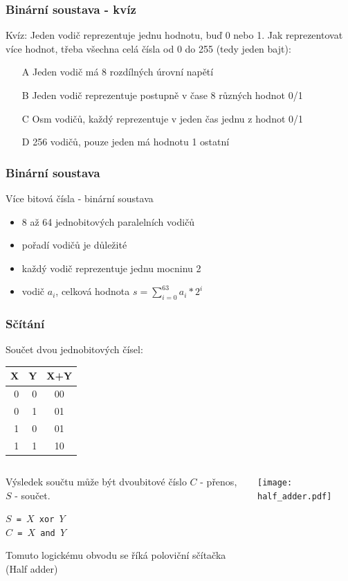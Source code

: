 \documentclass{beamer}
\begin{document}
\begin{frame}
\frametitle{Binární soustava - kvíz}

Kvíz: Jeden vodič reprezentuje jednu hodnotu, buď 0 nebo 1. Jak reprezentovat více hodnot, třeba všechna celá čísla od 0 do 255 (tedy jeden bajt):
\begin{itemize}
\item[A] Jeden vodič má 8 rozdílných úrovní napětí
\item[B] Jeden vodič reprezentuje postupně v čase 8 různých hodnot 0/1
\item[C] Osm vodičů, každý reprezentuje v jeden čas jednu z hodnot 0/1
\item[D] 256 vodičů, pouze jeden má hodnotu 1 ostatní 
\end{itemize}


\end{frame}


\begin{frame}
\frametitle{Binární soustava}

Více bitová čísla - binární soustava
\begin{itemize}
\item 8 až 64 jednobitových paralelních vodičů
\item pořadí vodičů je důležité
\item každý vodič reprezentuje jednu mocninu 2
\item vodič $a_{i}$, celková hodnota $s = \sum_{i=0}^{63} a_{i}*2^{i}$
\end{itemize}

\end{frame}


\begin{frame}
\frametitle{Sčítání}

Součet dvou jednobitových čísel:
\begin{tabular}{|r|r|c|}\hline
X & Y & X+Y\\ \hline
0 & 0 & 00\\ \hline
0 & 1 & 01\\ \hline
1 & 0 & 01\\ \hline
1 & 1 & 10\\ \hline
\end{tabular}

\bigskip

\begin{columns}
\begin{column}{0.55\textwidth}
Výsledek součtu může být dvoubitové číslo $C$ - přenos, $S$ - součet.
\bigskip

\texttt{$S$ = $X$ xor $Y$}\\
\texttt{$C$ = $X$ and $Y$}

\bigskip

Tomuto logickému obvodu se říká poloviční sčítačka (Half adder)
\end{column}
\begin{column}{0.45\textwidth}  
\begin{center}
   \texttt{[image: half\_adder.pdf]}
\end{center}
\end{column}
\end{columns}

\end{frame}
\end{document}
